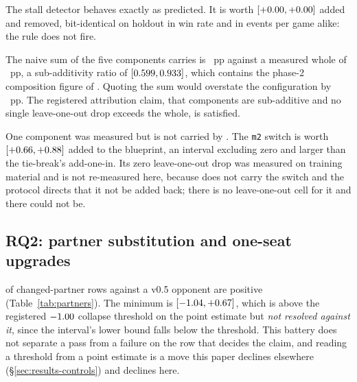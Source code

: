 The stall detector behaves exactly as predicted. It is worth \vsevenAddInStall{}
$[+0.00, +0.00]$ added and \vsevenLooStall{} removed, bit-identical on
holdout in win rate and in events per game alike: the rule does not fire.

The naive sum of the five components \sestina{} carries is \vsevenBfiveSum{}~pp against a measured
whole of \vsevenBfiveWhole{}~pp, a sub-additivity ratio of \vsevenSubAdditivity{}
$[0.599, 0.933]$, which contains the phase-2 composition figure of
\vsevenSubAddPhaseTwo{}. Quoting the sum would overstate the configuration by
\vsevenSubAdditivityOverstate{}~pp. The registered attribution claim, that components are
sub-additive and no single leave-one-out drop exceeds the whole, is satisfied.

One component was measured but is not carried by \sestina{}. The \texttt{m2} switch is worth
\vsevenAddInMtwo{} $[+0.66, +0.88]$ added to the blueprint, an interval
excluding zero and larger than the tie-break's add-one-in. Its zero leave-one-out drop was measured
on training material and is not re-measured here, because \sestina{} does not carry the switch and
the protocol directs that it not be added back; there is no leave-one-out cell for it and there could
not be.

\subsection{RQ2: partner substitution and one-seat upgrades}
\label{sec:results-partners}

\vsevenSonePositive{} of \vsevenSoneRows{} changed-partner rows against a v0.5 opponent are positive
(Table~\ref{tab:partners}). The minimum is
\vsevenSoneMin{} $[-1.04, +0.67]$, which is above the
registered $-1.00{}$ collapse threshold on the point estimate but \emph{not resolved
against it}, since the interval's lower bound falls below the threshold. This battery does not
separate a pass from a failure on the row that decides the claim, and reading a threshold from a
point estimate is a move this paper declines elsewhere (\S\ref{sec:results-controls}) and declines
here.

\begin{table}[!ht]\centering
\caption{Partner-regime table against a v0.5 opponent. Team A is the evaluated configuration plus two
copies of the named partner; team B is three copies of the opponent. Per-bank values are given in
bank order, 7090001 then 7090002.}
\label{tab:partners}
{\tabfont}
\end{table}

